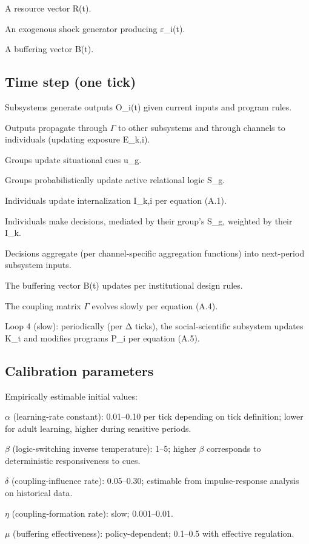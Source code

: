 \documentclass[12pt,a4paper]{article}
\begin{document}
A resource vector R(t).

An exogenous shock generator producing $\varepsilon$_i(t).

A buffering vector B(t).

\subsection{Time step (one tick)}

Subsystems generate outputs O_i(t) given current inputs and program rules.

Outputs propagate through $\Gamma$ to other subsystems and through channels to individuals (updating exposure E_{k,i}).

Groups update situational cues u_g.

Groups probabilistically update active relational logic S_g.

Individuals update internalization I_{k,i} per equation (A.1).

Individuals make decisions, mediated by their group's S_g, weighted by their I_k.

Decisions aggregate (per channel-specific aggregation functions) into next-period subsystem inputs.

The buffering vector B(t) updates per institutional design rules.

The coupling matrix $\Gamma$ evolves slowly per equation (A.4).

Loop 4 (slow): periodically (per Δ ticks), the social-scientific subsystem updates K_t and modifies programs P_i per equation (A.5).

\subsection{Calibration parameters}

Empirically estimable initial values:


$\alpha$ (learning-rate constant): 0.01--0.10 per tick depending on tick definition; lower for adult learning, higher during sensitive periods.

$\beta$ (logic-switching inverse temperature): 1--5; higher $\beta$ corresponds to deterministic responsiveness to cues.

$\delta$ (coupling-influence rate): 0.05--0.30; estimable from impulse-response analysis on historical data.

$\eta$ (coupling-formation rate): slow; 0.001--0.01.

$\mu$ (buffering effectiveness): policy-dependent; 0.1--0.5 with effective regulation.
\end{document}
